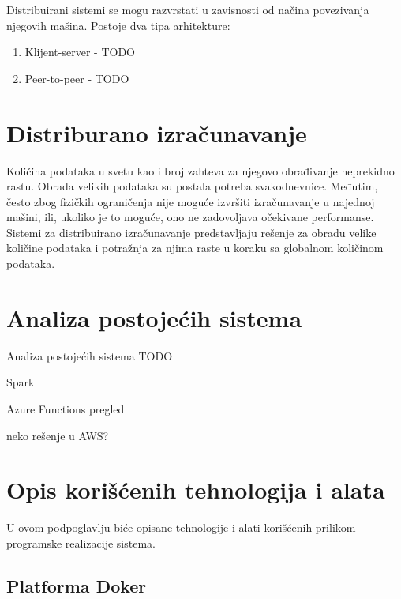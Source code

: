 \documentclass[12pt,oneside]{memoir}
\begin{document}
Distribuirani sistemi se mogu razvrstati u zavisnosti od načina povezivanja njegovih mašina. Postoje dva tipa arhitekture:
\begin{enumerate}
\item Klijent-server - TODO
\item Peer-to-peer - TODO
\end{enumerate}



\section{Distriburano izračunavanje}

Količina podataka u svetu kao i broj zahteva za njegovo obrađivanje neprekidno rastu. Obrada velikih podataka su postala potreba svakodnevnice. Međutim, često zbog fizičkih ograničenja nije moguće izvršiti izračunavanje u najednoj mašini, ili, ukoliko je to moguće, ono ne zadovoljava očekivane performanse. Sistemi za distribuirano izračunavanje predstavljaju rešenje za obradu velike količine podataka i potražnja za njima raste u koraku sa globalnom količinom podataka.

\section{Analiza postojećih sistema}
\label{sec:postojeca_resenja}

Analiza postojećih sistema TODO

Spark \cite{Spark}

Azure Functions pregled

neko rešenje u AWS?


\section{Opis korišćenih tehnologija i alata}

U ovom podpoglavlju biće opisane tehnologije i alati korišćenih prilikom programske realizacije sistema.

\subsection{Platforma Doker}
\label{subs:docker_platform}
\end{document}
